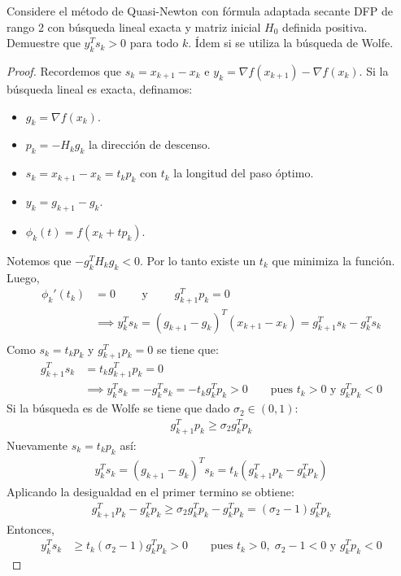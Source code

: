 \documentclass{article}
\newenvironment{theorem}[2][Ejercicio]{\begin{trivlist}
\item[\hskip \labelsep {\bfseries #1}\hskip \labelsep {\bfseries #2.}]}{\end{trivlist}}
\begin{document}
\begin{theorem}{9}
    Considere el método de Quasi-Newton con fórmula adaptada secante DFP de rango 2
    con búsqueda lineal exacta y matriz inicial \(H_0\) definida positiva.
    Demuestre que \(y_k^T s_k > 0\) para todo \(k\).
    Ídem si se utiliza la búsqueda de Wolfe.
\end{theorem}

\begin{proof}
    Recordemos que \( s_k = x_{k+1} - x_k \) e \( y_k = \nabla f(x_{k+1}) - \nabla f(x_k) \). Si la búsqueda lineal es exacta, definamos: \begin{itemize}
        \item \( g_k = \nabla f(x_k) \).
        \item \( p_k = - H_k g_k \) la dirección de descenso.
        \item \( s_k = x_{k+1} - x_k = t_k p_k \) con \( t_k \) la longitud del paso óptimo.
        \item \( y_k = g_{k+1} - g_k \).
        \item \( \phi_k(t) = f(x_k + t p_k) \).
    \end{itemize}
    Notemos que \( -g_k^T H_k g_k < 0 \). Por lo tanto existe un \( t_k \) que minimiza la función. Luego, \begin{align*}
        \phi_k'(t_k) & = 0 \qquad \text{ y } \qquad g_{k+1}^T p_k = 0                                       \\
                     & \implies y_k^T s_k = {(g_{k+1} - g_k)}^T (x_{k+1} - x_k) = g_{k+1}^T s_k - g_k^T s_k \\
    \end{align*}
    Como \( s_k = t_k p_k \) y \( g_{k+1}^T p_k = 0 \) se tiene que: \begin{align*}
        g_{k+1}^T s_k & = t_k g_{k+1}^T p_k = 0                                                                                     \\
                      & \implies y_k^T s_k = - g_k^T s_k = - t_k g_k^T p_k > 0 \qquad \text{pues } t_k > 0 \text{ y } g_k^T p_k < 0
    \end{align*}
    Si la búsqueda es de Wolfe se tiene que dado \( \sigma_2 \in (0, 1) \): \begin{align*}
        g_{k+1}^T p_k \geq \sigma_2 g_k^T p_k
    \end{align*}
    Nuevamente \( s_k = t_k p_k \) así: \begin{align*}
        y_k^T s_k = {(g_{k+1} - g_k)}^T  s_k = t_k (g_{k+1}^T p_k - g_k^T p_k)
    \end{align*}
    Aplicando la desigualdad en el primer termino se obtiene: \begin{align*}
        g_{k+1}^T p_k - g_k^T p_k \geq \sigma_2 g_k^T p_k - g_k^T p_k = (\sigma_2 - 1) g_k^T p_k
    \end{align*}
    Entonces, \begin{align*}
        y_k^T s_k & \geq t_k (\sigma_2 - 1) g_k^T p_k > 0 \qquad \text{pues } t_k > 0, \; \sigma_2 - 1 < 0 \text{ y } g_k^T p_k < 0
    \end{align*}
\end{proof}

\vspace{0.25in}
\end{document}
